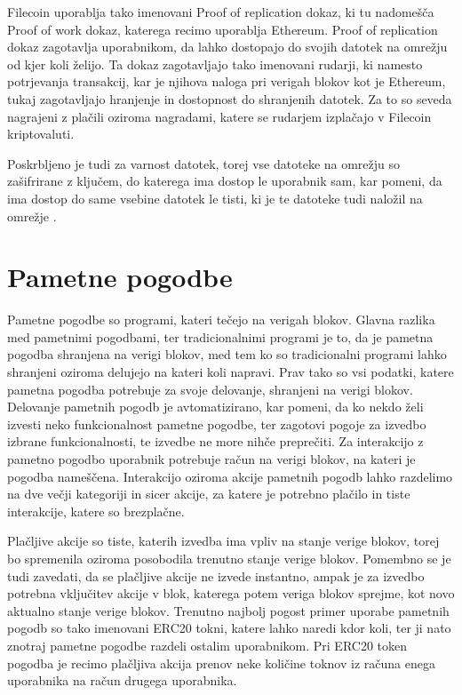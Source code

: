 \documentclass[a4paper,12pt,openright]{book}
\begin{document}
Filecoin uporablja tako imenovani Proof of replication dokaz, ki tu nadomešča Proof of work dokaz, katerega recimo uporablja Ethereum.
Proof of replication dokaz zagotavlja uporabnikom, da lahko dostopajo do svojih datotek na omrežju od kjer koli želijo.
Ta dokaz zagotavljajo tako imenovani rudarji, ki namesto potrjevanja transakcij, kar je njihova naloga pri verigah blokov kot je Ethereum, tukaj
zagotavljajo hranjenje in dostopnost do shranjenih datotek.
Za to so seveda nagrajeni z plačili oziroma nagradami, katere se rudarjem izplačajo v Filecoin kriptovaluti.

Poskrbljeno je tudi za varnost datotek, torej vse datoteke na omrežju so zašifrirane z ključem, do katerega ima dostop le uporabnik sam, kar pomeni, 
da ima dostop do same vsebine datotek le tisti, ki je te datoteke tudi naložil na omrežje \cite{filecoin}.

\section{Pametne pogodbe}
Pametne pogodbe so programi, kateri tečejo na verigah blokov.
Glavna razlika med pametnimi pogodbami, ter tradicionalnimi programi je to, da je pametna pogodba shranjena na verigi blokov, med tem ko so tradicionalni programi lahko shranjeni oziroma delujejo na kateri koli napravi.
Prav tako so vsi podatki, katere pametna pogodba potrebuje za svoje delovanje, shranjeni na verigi blokov.
Delovanje pametnih pogodb je avtomatizirano, kar pomeni, da ko nekdo želi izvesti neko funkcionalnost pametne pogodbe, ter zagotovi pogoje za izvedbo izbrane funkcionalnosti, te izvedbe ne more nihče preprečiti.
Za interakcijo z pametno pogodbo uporabnik potrebuje račun na verigi blokov, na kateri je pogodba nameščena.
Interakcijo oziroma akcije pametnih pogodb lahko razdelimo na dve večji kategoriji in sicer akcije, za katere je potrebno plačilo in tiste interakcije, katere so brezplačne.

Plačljive akcije so tiste, katerih izvedba ima vpliv na stanje verige blokov, torej bo spremenila oziroma posobodila trenutno stanje verige blokov.
Pomembno se je tudi zavedati, da se plačljive akcije ne izvede instantno, ampak je za izvedbo potrebna vključitev akcije v blok, katerega potem veriga blokov sprejme, kot novo aktualno stanje verige blokov.
Trenutno najbolj pogost primer uporabe pametnih pogodb so tako imenovani ERC20 tokni, katere lahko naredi kdor koli, ter ji nato znotraj pametne pogodbe razdeli ostalim uporabnikom. Pri ERC20 token pogodba je recimo plačljiva akcija prenov neke količine toknov iz računa enega uporabnika na račun drugega uporabnika.
\end{document}

